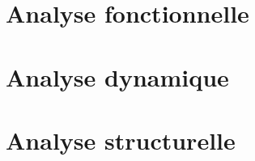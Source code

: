 


\section{Analyse fonctionnelle }

\section{Analyse dynamique  }

\section{Analyse structurelle   }
